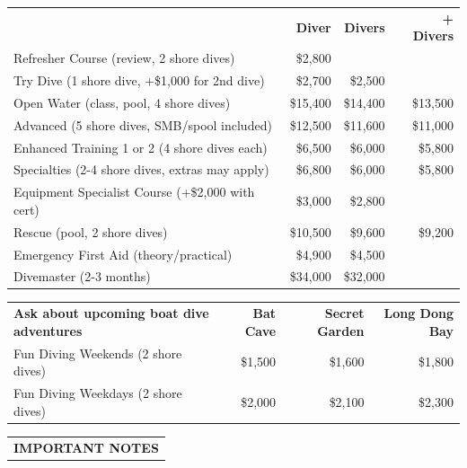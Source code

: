 \documentclass[a4paper,10pt]{article}
\makeatletter
\newcommand{\formheader}[1]{%
  \needspace{5\baselineskip}%
  \vspace{8pt}%
  \begingroup\renewcommand{\arraystretch}{1.0}%
  \noindent\begin{tabularx}{\textwidth}{@{}X@{}}
  \rowcolor{ocean}
  \rule{0pt}{12pt}\color{white}\bfseries\sffamily\small\hspace{4pt}#1 \\[-3pt]
  \end{tabularx}%
  \endgroup
  \vspace{6pt}%
  \nopagebreak[4]%
}
\makeatother
\begin{document}
\renewcommand{\arraystretch}{1.25}
\small
{}
\begin{tabularx}{\textwidth}{@{}XRRR@{}}
 & \textbf{ Diver} & \textbf{ Divers} & \textbf{+ Divers} \\
Refresher Course {\footnotesize(review, 2 shore dives)} & \$2,800 & & \\
Try Dive {\footnotesize(1 shore dive, +\$1,000 for 2nd dive)} & \$2,700 & \$2,500 & \\
Open Water {\footnotesize(class, pool, 4 shore dives)} & \$15,400 & \$14,400 & \$13,500 \\
Advanced {\footnotesize(5 shore dives, SMB/spool included)} & \$12,500 & \$11,600 & \$11,000 \\
Enhanced Training 1 or 2 {\footnotesize(4 shore dives each)} & \$6,500 & \$6,000 & \$5,800 \\
Specialties {\footnotesize(2-4 shore dives, extras may apply)} & \$6,800 & \$6,000 & \$5,800 \\
Equipment Specialist Course {\footnotesize(+\$2,000 with cert)} & \$3,000 & \$2,800 & \\
Rescue {\footnotesize(pool, 2 shore dives)} & \$10,500 & \$9,600 & \$9,200 \\
Emergency First Aid {\footnotesize(theory/practical)} & \$4,900 & \$4,500 & \\
Divemaster {\footnotesize(2-3 months)} & \$34,000 & \$32,000 & \\
\end{tabularx}

\vspace{4pt}


\begin{tabularx}{\textwidth}{@{}XRRR@{}}
\textbf{\sffamily Ask about upcoming boat dive adventures} & \textbf{\sffamily Bat Cave} & \textbf{\sffamily Secret Garden} & \textbf{\sffamily Long Dong Bay} \\
Fun Diving Weekends {\footnotesize(2 shore dives)} & \$1,500 & \$1,600 & \$1,800 \\
Fun Diving Weekdays {\footnotesize(2 shore dives)} & \$2,000 & \$2,100 & \$2,300 \\
\end{tabularx}

\formheader{IMPORTANT NOTES}
\end{document}

